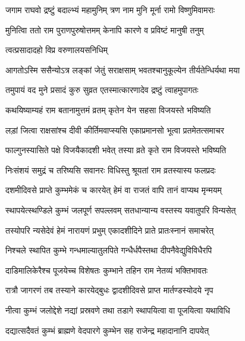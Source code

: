 \twolineshloka
{जगाम राघवो द्रष्टुं बदाल्भ्यं महामुनिम्}
{त्रण नाम मुनि मूर्ना रामो विष्णुमिवामराः} %

\twolineshloka
{मुनित्विा ततो राम पुराणपुरुषोत्तमम्}
{केनापि कारणे व प्रविष्टं मानुषी तनुम्} %



\onelineshloka
{त्वत्प्रसादादहो विप्र वरुणालयसनिधिम्} %

\twolineshloka
{आगतोऽस्मि ससैन्योऽत्र लङ्कां जेतुं सराक्षसाम्}
{भवतश्चानुकूल्येन तीर्यतेन्धिर्यथा मया} %

\twolineshloka
{तमुपायं वद मुने प्रसादं कुरु सुव्रत}
{एतस्मात्कारणादेव द्रष्टुं त्वाहमुपागतः} %


\twolineshloka
{कथयिष्याम्यहं राम बतानामुत्तमं व्रतम्}
{कृतेन येन सहसा विजयस्ते भविष्यति} %

\twolineshloka
{लड़ां जित्वा राक्षसांश्च दीवी कीर्तिमवाप्स्यसि}
{एकाप्रमानसो भूत्वा प्रतमेतत्समाचर} %

\twolineshloka
{फाल्गुनस्यासिते पक्षे विजयैकादशी भवेत्}
{तस्या व्रते कृते राम विजयस्ते भविष्यति} %

\twolineshloka
{निःसंशयं समुद्रं च तरिष्यसि सवानरः}
{विधिस्तु श्रूयतां राम व्रतस्यास्य फलप्रदः} %

\twolineshloka
{दशमीदिवसे प्राप्ते कुम्भमेकं च कारयेत्}
{हेमं वा राजतं वापि तानं वाप्यथ मृन्मयम्} %

\twolineshloka
{स्थापयेत्स्थण्डिले कुम्भं जलपूर्ण सपल्लवम्}
{सतधान्यान्य वस्तस्य यवातुपरि विन्यसेत्} %

\twolineshloka
{तस्योपरि न्यसेदेवं हेमं नारायणं प्रभुम्}
{एकादशीदिने प्राते प्रातःस्नानं समाचरेत्} %

\twolineshloka
{निश्चले स्थापित कुम्भे गन्धमाल्यातुलपिते}
{गन्धैर्धपैस्तथा दीपनैवेद्युविविधैरपि} %

\twolineshloka
{दाडिमालिकेरैश्च पूजयेच्च विशेषतः}
{कुम्भाने तहिन राम नेतव्यं भक्तिभावतः} %

\twolineshloka
{रात्रौ जागरणं तब तस्याने कारयेद्बुधः}
{द्वादशीदिवसे प्राप्त मार्तण्डस्योदये नृप} %

\twolineshloka
{नीत्वा कुम्भं जलोद्देशे नद्यां प्रस्रवणे तथा}
{तडागे स्थापयित्वा वा पूजयित्वा यथाविधि} %

\twolineshloka
{दद्यात्सदैवतं कुम्भं ब्राह्मणे वेदपारगे}
{कुम्भेन सह राजेन्द्र महादानानि दापयेत्} %

